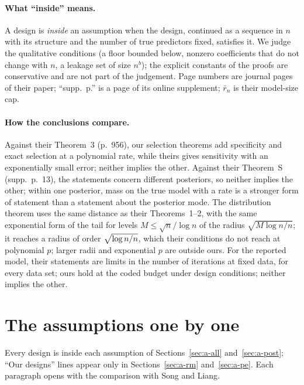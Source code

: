\documentclass[11pt]{article}
\newcommand{\SL}{Song and Liang}
\begin{document}
\paragraph{What ``inside'' means.} A design is \emph{inside} an assumption when the design, continued as a sequence in
$n$ with its structure and the number of true predictors fixed, satisfies it. We judge the qualitative conditions (a
floor bounded below, nonzero coefficients that do not change with $n$, a leakage set of size $n^b$); the explicit
constants of the proofs are conservative and are not part of the judgement. Page numbers are journal pages of their paper; ``supp.\ p.'' is a page of its online supplement; $\bar r_n$ is
their model-size cap.

\paragraph{How the conclusions compare.} Against their Theorem~3 (p.~956), our selection theorems add specificity and
exact selection at a polynomial rate, while theirs gives sensitivity with an exponentially small error; neither implies
the other. Against their Theorem~S (supp.\ p.~13), the statements concern different posteriors, so neither implies the other; within one posterior,
mass on the true model with a rate is a stronger form of statement than a statement about the posterior mode. The
distribution theorem uses the same distance as their Theorems~1--2, with the same exponential form of the tail for
levels $M\le\sqrt n/\log n$ of the radius $\sqrt{M\log n/n}$; it reaches a radius of order $\sqrt{\log n/n}$, which their conditions do not reach at polynomial $p$;
larger radii and exponential $p$ are outside ours. For the reported model, their
statements are limits in the number of iterations at fixed data, for every data set; ours hold at the coded budget
under design conditions; neither implies the other.



\section{The assumptions one by one}\label{sec:a-each}

Every design is inside each assumption of Sections~\ref{sec:a-all} and~\ref{sec:a-post}; ``Our designs'' lines
appear only in Sections~\ref{sec:a-rm} and~\ref{sec:a-pe}. Each paragraph opens with the comparison with \SL.
\end{document}
